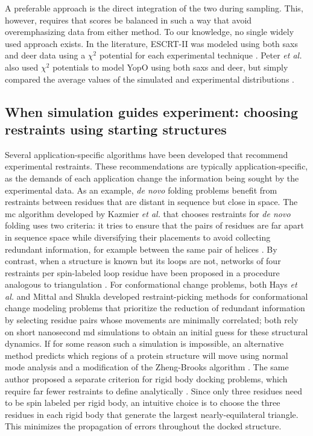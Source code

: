 A preferable approach is the direct integration of the two during sampling. This, however, requires that scores be balanced in such a way that avoid overemphasizing data from either method. To our knowledge, no single widely used approach exists. In the literature, ESCRT-II was modeled using both \gls{saxs} and \gls{deer} data using a $\chi^2$ potential for each experimental technique \citep*{Boura2012}. Peter \emph{et al.} also used $\chi^2$ potentials to model YopO using both \gls{saxs} and \gls{deer}, but simply compared the average values of the simulated and experimental distributions \citep*{Peter2019}.

\subsection{When simulation guides experiment: choosing restraints using starting structures}

Several application-specific algorithms have been developed that recommend experimental restraints. These recommendations are typically application-specific, as the demands of each application change the information being sought by the experimental data. As an example, \emph{de novo} folding problems benefit from restraints between residues that are distant in sequence but close in space. The \gls{mc} algorithm developed by Kazmier \emph{et al.} that chooses restraints for \emph{de novo} folding uses two criteria: it tries to ensure that the pairs of residues are far apart in sequence space while diversifying their placements to avoid collecting redundant information, for example between the same pair of helices \citep*{Kazmier2011}. By contrast, when a structure is known but its loops are not, networks of four restraints per spin-labeled loop residue have been proposed in a procedure analogous to triangulation \citep*{Jeschke2016}. For conformational change problems, both Hays \emph{et al.} \citep*{Hays2018} and Mittal and Shukla \citep*{Mittal2017} developed restraint-picking methods for conformational change modeling problems that prioritize the reduction of redundant information by selecting residue pairs whose movements are minimally correlated; both rely on short nanosecond \gls{md} simulations to obtain an initial guess for these structural dynamics. If for some reason such a simulation is impossible, an alternative method \citep*{Jeschke2012a} predicts which regions of a protein structure will move using normal mode analysis and a modification of the Zheng-Brooks algorithm \citep*{Zheng2005}. The same author proposed a separate criterion for rigid body docking problems, which require far fewer restraints to define analytically \citep*{Jeschke2020}. Since only three residues need to be spin labeled per rigid body, an intuitive choice is to choose the three residues in each rigid body that generate the largest nearly-equilateral triangle. This minimizes the propagation of errors throughout the docked structure.


